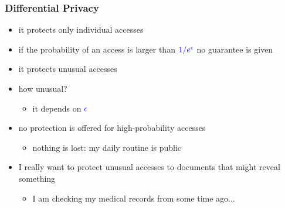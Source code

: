 \documentclass[]{beamer}
\begin{document}
\begin{frame}
\frametitle{Differential Privacy}

\begin{itemize}[<+->]
\item it protects only \alert{individual} accesses
\item if the probability of an access
is larger than $\color{blue}1/e^{\epsilon}$ no guarantee is given
\item it protects {\color{purple} unusual accesses}
\item how unusual?
    \begin{itemize} \item it depends on $\color{blue}\epsilon$ \end{itemize}
\item no protection is offered for {\color{brown}high-probability} accesses
    \begin{itemize}
        \item {\color{olive} nothing is lost: my daily routine is public}
    \end{itemize}
\item I really want to protect {\color{purple} unusual accesses}
    to documents that might reveal something

    \begin{itemize}
        \item I am checking my medical records from some time ago...
    \end{itemize}
\end{itemize}



\end{frame}
\end{document}
